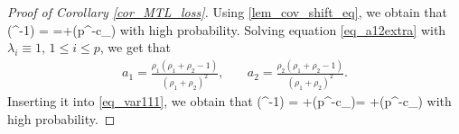 \begin{proof}[Proof of Corollary \ref{cor_MTL_loss}]
Using \eqref{lem_cov_shift_eq}, we obtain that 
\be\label{eq_var111}\tr(\hat\Sigma^{-1}) = \tr{}=+\OO(p^{-c_\varphi})\ee
with high probability. Solving equation \eqref{eq_a12extra} with $\lambda_i\equiv 1$, $1\le i\le p$, we get that  
	\begin{align}
		 a_1 = \frac{\rho_1(\rho_1 + \rho_2 - 1)}{(\rho_1 + \rho_2)^2} ,\quad
		& a_2 = \frac{\rho_2(\rho_1 + \rho_2 - 1)}{(\rho_1 + \rho_2)^2} . \label{simplesovlea12}
			\end{align}
Inserting it into \eqref{eq_var111}, we obtain that 
\be\label{eq_var112}\tr(\hat\Sigma^{-1})  =  \cdot {}+\OO(p^{-c_\varphi})=  +\OO(p^{-c_\varphi})\ee
with high probability. 


\end{proof}
